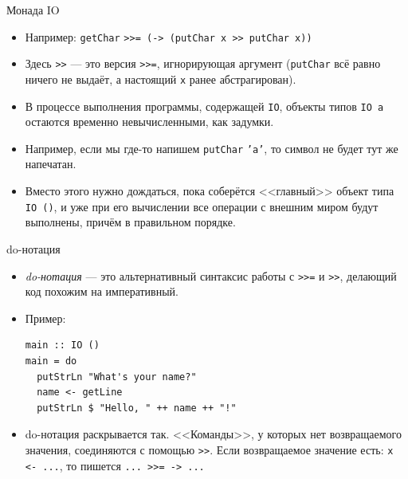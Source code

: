 \documentclass[xcolor=dvipsnames]{beamer}
\begin{document}
\begin{frame}{Монада IO}

\begin{itemize}[<+->]
\item Например: \texttt{getChar} \texttt{>>= (\x -> (putChar x >> putChar x))}
\item Здесь \texttt{>>} --- это версия \texttt{>>=}, игнорирующая аргумент ({\tt putChar} всё равно ничего не выдаёт, а настоящий {\tt x} ранее абстрагирован).
 \item В процессе выполнения программы, содержащей \texttt{IO}, объекты типов \texttt{IO a} остаются временно невычисленными, как задумки.
 \item Например, если мы где-то напишем \texttt{putChar} \texttt{'a'}, то символ не будет тут же напечатан.
 \item Вместо этого нужно дождаться, пока соберётся <<главный>> объект типа \texttt{IO ()}, и уже при его вычислении все операции с внешним миром будут выполнены, причём в правильном порядке.
\end{itemize}

 
 
\end{frame}

\begin{frame}[fragile]{do-нотация}
 
 \begin{itemize}[<+->]
  \item {\em do-нотация} --- это альтернативный синтаксис работы с \texttt{>>=} и \texttt{>>}, делающий код похожим на императивный.
  \item Пример:
\begin{verbatim}
main :: IO ()
main = do
  putStrLn "What's your name?"
  name <- getLine
  putStrLn $ "Hello, " ++ name ++ "!"
\end{verbatim}
\item do-нотация раскрывается так. <<Команды>>, у которых нет возвращаемого значения, соединяются с помощью \texttt{>>}. Если возвращаемое значение есть: \texttt{x} \texttt{<- ...}, то пишется \texttt{... >>= \x -> ...}
 \end{itemize}

\end{frame}
\end{document}
